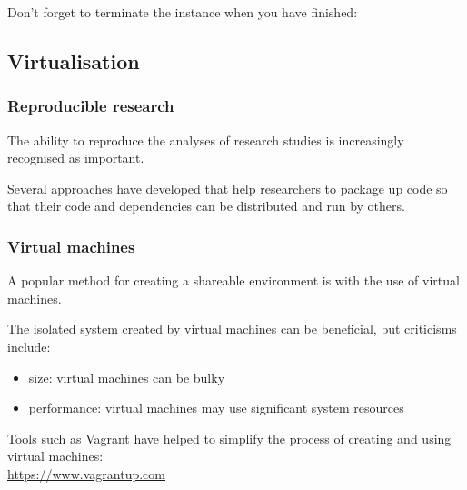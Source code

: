 Don't forget to terminate the instance when you have finished:

\begin{Shaded}
\begin{Highlighting}[]
\NormalTok{$ } \KeywordTok{<}\KeywordTok{>}

    
    
   
\end{Highlighting}
\end{Shaded}

\subsection{Virtualisation}\label{virtualisation}

\subsubsection{Reproducible research}\label{reproducible-research}

The ability to reproduce the analyses of research studies is
increasingly recognised as important.

Several approaches have developed that help researchers to package up
code so that their code and dependencies can be distributed and run by
others.

\subsubsection{Virtual machines}\label{virtual-machines}

A popular method for creating a shareable environment is with the use of
virtual machines.

The isolated system created by virtual machines can be beneficial, but
criticisms include:

\begin{itemize}
\itemsep1pt\parskip0pt
\item
  size: virtual machines can be bulky
\item
  performance: virtual machines may use significant system resources
\end{itemize}

Tools such as Vagrant have helped to simplify the process of creating
and using virtual
machines:\\\href{https://www.vagrantup.com/}{https://www.vagrantup.com}

